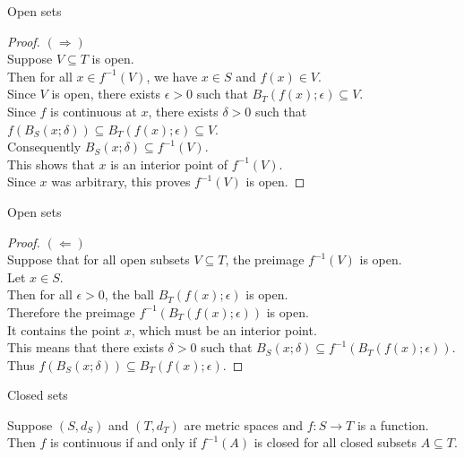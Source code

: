 \documentclass{beamer}
\begin{document}
\begin{frame}{Open sets}
\begin{proof}
\pause
$(\Rightarrow)$\\
\pause
Suppose $V\subseteq T$ is open.\\
\pause
Then for all $x\in f^{-1}(V)$, we have $x\in S$ and $f(x)\in V$.\\
\pause
Since $V$ is open, there exists $\epsilon > 0$ such that $B_T(f(x);\epsilon)\subseteq V$.\\
\pause
Since $f$ is continuous at $x$, there exists $\delta > 0$ such that $f(B_S(x;\delta))\subseteq B_T(f(x);\epsilon)\subseteq V$.\\
\pause
Consequently $B_S(x;\delta)\subseteq f^{-1}(V)$.\\
\pause
This shows that $x$ is an interior point of $f^{-1}(V)$.\\
\pause
Since $x$ was arbitrary, this proves $f^{-1}(V)$ is open.
\end{proof}
\end{frame}


\begin{frame}{Open sets}
\begin{proof}
\pause
$(\Leftarrow)$\\
\pause
Suppose that for all open subsets $V\subseteq T$, the preimage $f^{-1}(V)$ is open.\\
\pause
Let $x\in S$.\\
\pause
Then for all $\epsilon > 0$, the ball $B_T(f(x);\epsilon)$ is open.\\
\pause
Therefore the preimage $f^{-1}(B_T(f(x);\epsilon))$ is open.\\
\pause
It contains the point $x$, which must be an interior point.\\
\pause
This means that there exists $\delta > 0$ such that $B_S(x;\delta)\subseteq f^{-1}(B_T(f(x);\epsilon)).$\\
\pause
Thus $f(B_S(x;\delta))\subseteq B_T(f(x);\epsilon)$.
\end{proof}
\end{frame}

\begin{frame}{Closed sets}
\begin{thm}
Suppose $(S,d_S)$ and $(T,d_T)$ are metric spaces and $f: S\rightarrow T$ is a function.\\
\pause
Then $f$ is continuous if and only if $f^{-1}(A)$ is closed for all closed subsets $A\subseteq T$.
\end{thm}
\end{frame}
\end{document}
